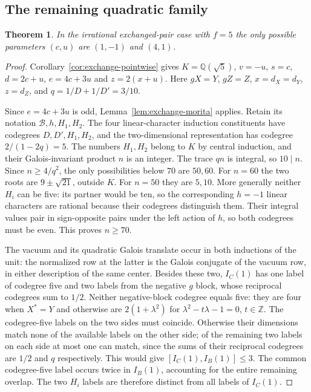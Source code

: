 \documentclass[11pt,a4paper]{article}
\newtheorem{theorem}{Theorem}[section]
\numberwithin{equation}{section}
\begin{document}
\subsection{The remaining quadratic family}
\begin{theorem}\label{thm:exchange-five-effective}
In the irrational exchanged-pair case with $f=5$ the only possible parameters $(c,u)$ are $(1,-1)$ and $(4,1)$.
\end{theorem}
\begin{proof}
Corollary~\ref{cor:exchange-pointwise} gives $K=\mathbb Q(\sqrt5)$, $v=-u$, $s=c$, $d=2c+u$, $e=4c+3u$ and $z=2(x+u)$. Here $gX=Y$, $gZ=Z$, $x=d_X=d_Y$, $z=d_Z$, and $q=1/D+1/D'=3/10$.

Since $e=4c+3u$ is odd, Lemma~\ref{lem:exchange-morita}
applies. Retain its notation $\mathcal B,h,H_1,H_2$.
The four linear-character induction constituents have codegrees
$D,D',H_1,H_2$, and the two-dimensional representation has codegree
$2/(1-2q)=5$.
The numbers $H_1,H_2$ belong to $K$ by central
induction, and their Galois-invariant product $n$ is an integer.
The trace $qn$ is integral, so $10\mid n$. Since $n\ge4/q^2$,
the only possibilities below $70$ are $50,60$. For $n=60$ the
two roots are $9\pm\sqrt{21}$, outside $K$. For $n=50$ they
are $5,10$. More generally neither $H_i$ can be five: its partner
would be ten, so the corresponding $h=-1$ linear characters are
rational because their codegrees distinguish them. Their integral
values pair in sign-opposite pairs under the left action of $h$, so
both codegrees must be even. This proves $n\ge70$.

The vacuum and its quadratic Galois translate occur in both
inductions of the unit: the normalized row at the latter is the
Galois conjugate of the vacuum row, in either description of the
same center. Besides these two, $I_C(1)$ has one label of codegree five
and two labels from the negative $g$ block, whose reciprocal codegrees
sum to $1/2$. Neither negative-block codegree equals five: they are
four when $X^*=Y$ and otherwise are $2(1+\lambda^2)$ for
$\lambda^2-t\lambda-1=0$, $t\in\mathbb Z$.
The codegree-five labels on the two sides must coincide.
Otherwise their dimensions match none of the available labels on
the other side; of the remaining two labels on each side at most
one can match, since the sums of their reciprocal codegrees are
$1/2$ and $q$ respectively. This would give
$[I_C(1),I_B(1)]\le3$. The common codegree-five label occurs twice
in $I_B(1)$, accounting for the entire remaining overlap. The two
$H_i$ labels are therefore distinct from all labels of $I_C(1)$.


\end{proof}
\end{document}
